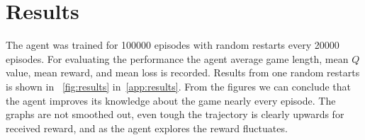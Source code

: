 \section{Results}
The agent was trained for 100000 episodes with random restarts every 20000 episodes. For evaluating the performance the agent average game length, mean \(Q\) value, mean reward, and mean loss is recorded. Results from one random restarts is shown in ~\autoref{fig:results} in~\autoref{app:results}. From the figures we can conclude that the agent improves its knowledge about the game nearly every episode. The graphs are not smoothed out, even tough the trajectory is clearly upwards for received reward, and as the agent explores the reward fluctuates.
